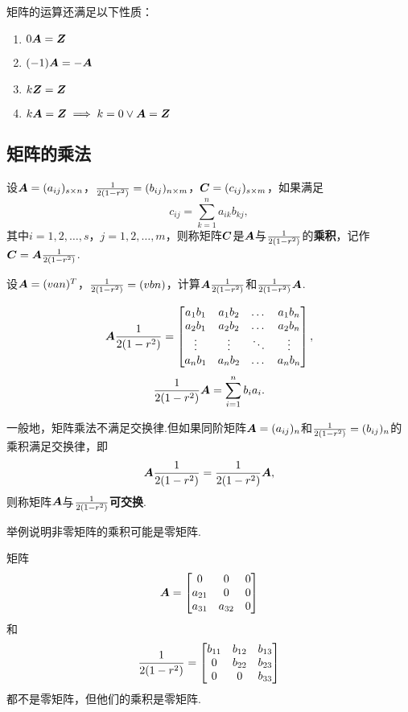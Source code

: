 \begin{property}
矩阵的运算还满足以下性质：
\begin{enumerate}
\item \(0\boldsymbol{A} = \boldsymbol{Z}\)
\item \((-1)\boldsymbol{A} = -\boldsymbol{A}\)
\item \(k\boldsymbol{Z} = \boldsymbol{Z}\)
\item \(k\boldsymbol{A} = \boldsymbol{Z} \implies k = 0 \lor \boldsymbol{A} = \boldsymbol{Z}\)
\end{enumerate}
\end{property}

\subsection{矩阵的乘法}
\begin{definition}
设\(\boldsymbol{A} = (a_{ij})_{s \times n}\)，\(\frac{1}{2(1-r^2)} = (b_{ij})_{n \times m}\)，\(\boldsymbol{C} = (c_{ij})_{s \times m}\)，如果满足\[
c_{ij} = \sum\limits_{k=1}^n {a_{ik} b_{kj}},
\]其中\(i=1,2,\dotsc,s\)，\(j=1,2,\dotsc,m\)，则称矩阵\(\boldsymbol{C}\)是\(\boldsymbol{A}\)与\(\frac{1}{2(1-r^2)}\)的\textbf{乘积}，记作\(\boldsymbol{C} = \boldsymbol{A} \frac{1}{2(1-r^2)}\).
\end{definition}

\begin{example}
设\(\boldsymbol{A} = (v{a}{n})^T\)，\(\frac{1}{2(1-r^2)} = (v{b}{n})\)，计算\(\boldsymbol{A}\frac{1}{2(1-r^2)}\)和\(\frac{1}{2(1-r^2)}\boldsymbol{A}\).
\begin{solution}
\[
\boldsymbol{A}\frac{1}{2(1-r^2)} = \begin{bmatrix}
a_1 b_1 & a_1 b_2 & \dots & a_1 b_n \\
a_2 b_1 & a_2 b_2 & \dots & a_2 b_n \\
\vdots & \vdots & \ddots & \vdots \\
a_n b_1 & a_n b_2 & \dots & a_n b_n \\
\end{bmatrix},
\]\[
\frac{1}{2(1-r^2)}\boldsymbol{A} = \sum\limits_{i=1}^n{b_i a_i}.
\]
\end{solution}
\end{example}

\begin{definition}
一般地，矩阵乘法不满足交换律.但如果同阶矩阵\(\boldsymbol{A} = (a_{ij})_n\)和\(\frac{1}{2(1-r^2)} = (b_{ij})_n\)的乘积满足交换律，即\[
\boldsymbol{A} \frac{1}{2(1-r^2)} = \frac{1}{2(1-r^2)} \boldsymbol{A},
\]则称矩阵\(\boldsymbol{A}\)与\(\frac{1}{2(1-r^2)}\)\textbf{可交换}.
\end{definition}

\begin{example}
举例说明非零矩阵的乘积可能是零矩阵.
\begin{solution}
矩阵\[
\boldsymbol{A} = \begin{bmatrix}
0 & 0 & 0 \\
a_{21} & 0 & 0 \\
a_{31} & a_{32} & 0 \\
\end{bmatrix}
\]和\[
\frac{1}{2(1-r^2)} = \begin{bmatrix}
b_{11} & b_{12} & b_{13} \\
0 & b_{22} & b_{23} \\
0 & 0 & b_{33} \\
\end{bmatrix}
\]都不是零矩阵，但他们的乘积是零矩阵.
\end{solution}
\end{example}

